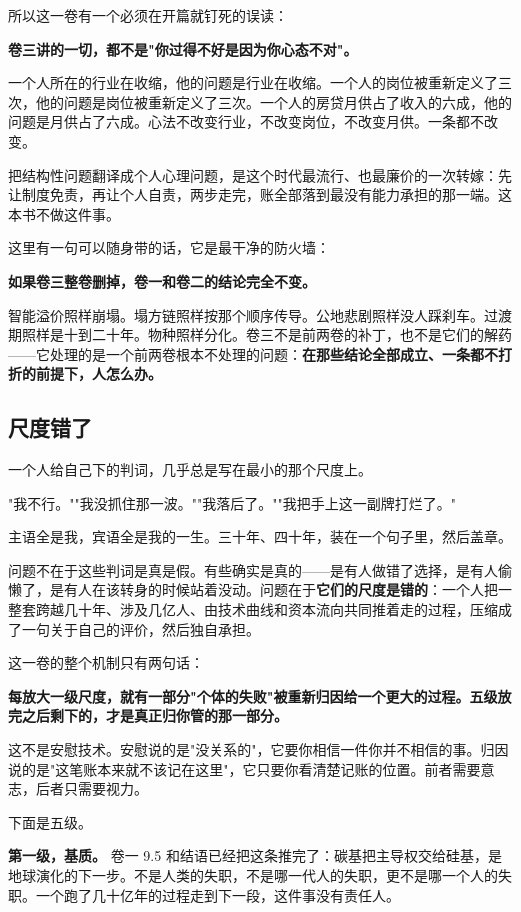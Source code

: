 \documentclass[11pt,a4paper]{ctexart}
\begin{document}
所以这一卷有一个必须在开篇就钉死的误读：

\textbf{卷三讲的一切，都不是"你过得不好是因为你心态不对"。}

一个人所在的行业在收缩，他的问题是行业在收缩。一个人的岗位被重新定义了三次，他的问题是岗位被重新定义了三次。一个人的房贷月供占了收入的六成，他的问题是月供占了六成。心法不改变行业，不改变岗位，不改变月供。一条都不改变。

把结构性问题翻译成个人心理问题，是这个时代最流行、也最廉价的一次转嫁：先让制度免责，再让个人自责，两步走完，账全部落到最没有能力承担的那一端。这本书不做这件事。

这里有一句可以随身带的话，它是最干净的防火墙：

\textbf{如果卷三整卷删掉，卷一和卷二的结论完全不变。}

智能溢价照样崩塌。塌方链照样按那个顺序传导。公地悲剧照样没人踩刹车。过渡期照样是十到二十年。物种照样分化。卷三不是前两卷的补丁，也不是它们的解药——它处理的是一个前两卷根本不处理的问题：\textbf{在那些结论全部成立、一条都不打折的前提下，人怎么办。}

\subsection{尺度错了}

一个人给自己下的判词，几乎总是写在最小的那个尺度上。

"我不行。""我没抓住那一波。""我落后了。""我把手上这一副牌打烂了。"

主语全是我，宾语全是我的一生。三十年、四十年，装在一个句子里，然后盖章。

问题不在于这些判词是真是假。有些确实是真的——是有人做错了选择，是有人偷懒了，是有人在该转身的时候站着没动。问题在于\textbf{它们的尺度是错的}：一个人把一整套跨越几十年、涉及几亿人、由技术曲线和资本流向共同推着走的过程，压缩成了一句关于自己的评价，然后独自承担。

这一卷的整个机制只有两句话：

\textbf{每放大一级尺度，就有一部分"个体的失败"被重新归因给一个更大的过程。}\textbf{五级放完之后剩下的，才是真正归你管的那一部分。}

这不是安慰技术。安慰说的是"没关系的"，它要你相信一件你并不相信的事。归因说的是"这笔账本来就不该记在这里"，它只要你看清楚记账的位置。前者需要意志，后者只需要视力。

下面是五级。

\textbf{第一级，基质。} 卷一 9.5 和结语已经把这条推完了：碳基把主导权交给硅基，是地球演化的下一步。不是人类的失职，不是哪一代人的失职，更不是哪一个人的失职。一个跑了几十亿年的过程走到下一段，这件事没有责任人。
\end{document}
